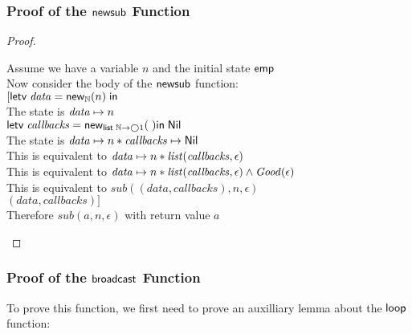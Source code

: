 \subsubsection{Proof of the $\mathsf{newsub}$ Function}
\begin{proof}
\begin{tabbedproof}
\oo Assume we have a variable $n$ and the initial state $\mathsf{emp}$\\
\ooo Now consider the body of the $\mathsf{newsub}$ function: \\
\ooo $[\mathsf{letv}\;\mathit{data} = \mathsf{new}_{\mathbb{N}}(n)\;\mathsf{in}\;$ \\
\ooo The state is $\mathit{data} \mapsto n$ \\
\ooo $\mathsf{letv}\;\mathit{callbacks} = \mathsf{new}_{\mathsf{list}\;{\mathbb{N}\to\bigcirc{1}}}(\;)\mathsf{in}\;\mathsf{Nil}{}$ \\
\ooo The state is $\mathit{data} \mapsto n * \mathit{callbacks} \mapsto \mathsf{Nil}$ \\
\ooo This is equivalent to $\mathit{data} \mapsto n * \mathit{list}(\mathit{callbacks}, \epsilon)$ \\
\ooo This is equivalent to $\mathit{data} \mapsto n * \mathit{list}(\mathit{callbacks}, \epsilon) \land \mathit{Good}(\epsilon)$ \\
\ooo This is equivalent to $\mathit{sub}(\mathit{(data,callbacks)}, n, \epsilon)$ \\
\ooo $(data, callbacks)]$ \\
\ooo Therefore $\mathit{sub}(a, n, \epsilon)$ with return value $a$ 
\end{tabbedproof}
\end{proof}

\subsubsection{Proof of the $\mathsf{broadcast}$ Function}

To prove this function, we first need to prove an auxilliary lemma about the $\mathsf{loop}$ function:

